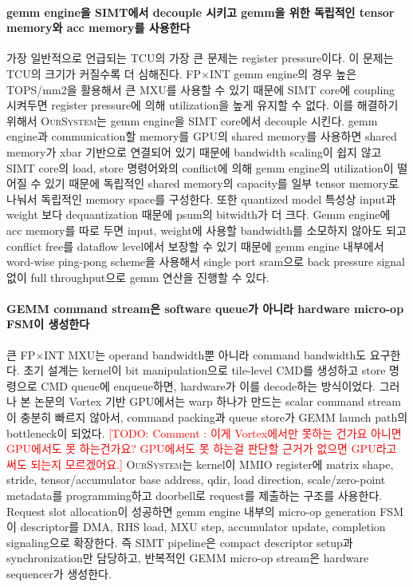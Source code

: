 \documentclass[11pt]{article}
\newcommand{\todo}[1]{\textcolor{red}{[TODO: #1]}}
\newcommand{\ours}{\textsc{OurSystem}}
\newcommand{\fpint}{FP$\times$INT}
\begin{document}
\paragraph{gemm engine을 SIMT에서 decouple 시키고 gemm을 위한 독립적인 tensor memory와 acc memory를 사용한다}
가장 일반적으로 언급되는 TCU의 가장 큰 문제는 register pressure이다. 이 문제는 TCU의 크기가 커질수록 더 심해진다. \fpint{} gemm engine의 경우 높은 TOPS/mm2을 활용해서 큰 MXU를 사용할 수 있기 때문에 SIMT core에 coupling 시켜두면 register pressure에 의해 utilization을 높게 유지할 수 없다. 이를 해결하기 위해서 \ours{}는 gemm engine을 SIMT core에서 decouple 시킨다. gemm engine과 communication할 memory를 GPU의 shared memory를 사용하면 shared memory가 xbar 기반으로 연결되어 있기 때문에 bandwidth scaling이 쉽지 않고 SIMT core의 load, store 명령어와의 conflict에 의해 gemm engine의 utilization이 떨어질 수 있기 때문에 독립적인 shared memory의 capacity를 일부 tensor memory로 나눠서 독립적인 memory space를 구성한다. 또한 quantized model 특성상 input과 weight 보다 dequantization 때문에 psum의 bitwidth가 더 크다. Gemm engine에 acc memory를 따로 두면 input, weight에 사용할 bandwidth를 소모하지 않아도 되고 conflict free를 dataflow level에서 보장할 수 있기 때문에 gemm engine 내부에서 word-wise ping-pong scheme을 사용해서 single port sram으로 back pressure signal 없이 full throughput으로 gemm 연산을 진행할 수 있다.

\paragraph{GEMM command stream은 software queue가 아니라 hardware micro-op FSM이 생성한다}
큰 \fpint{} MXU는 operand bandwidth뿐 아니라 command bandwidth도 요구한다. 초기 설계는 kernel이 bit manipulation으로 tile-level CMD를 생성하고 store 명령으로 CMD queue에 enqueue하면, hardware가 이를 decode하는 방식이었다. 그러나 본 논문의 Vortex 기반 GPU에서는 warp 하나가 만드는 scalar command stream이 충분히 빠르지 않아서, command packing과 queue store가 GEMM launch path의 bottleneck이 되었다. \todo{Comment : 이게 Vortex에서만 못하는 건가요 아니면 GPU에서도 못 하는건가요? GPU에서도 못 하는걸 판단할 근거가 없으면 GPU라고 써도 되는지 모르겠어요.} \ours{}는 kernel이 MMIO register에 matrix shape, stride, tensor/accumulator base address, qdir, load direction, scale/zero-point metadata를 programming하고 doorbell로 request를 제출하는 구조를 사용한다. Request slot allocation이 성공하면 gemm engine 내부의 micro-op generation FSM이 descriptor를 DMA, RHS load, MXU step, accumulator update, completion signaling으로 확장한다. 즉 SIMT pipeline은 compact descriptor setup과 synchronization만 담당하고, 반복적인 GEMM micro-op stream은 hardware sequencer가 생성한다.
\end{document}
